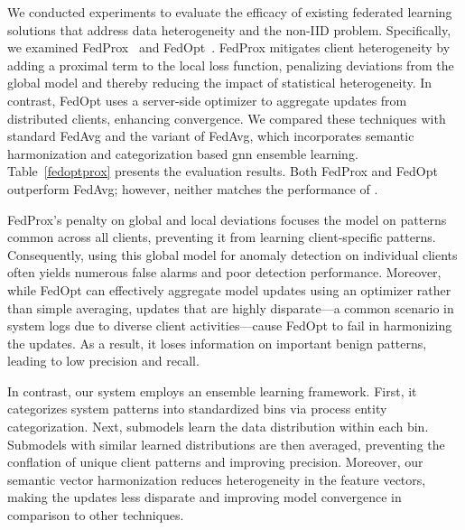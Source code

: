 We conducted experiments to evaluate the efficacy of existing federated learning solutions that address data heterogeneity and the non-IID problem. Specifically, we examined FedProx~\cite{li2020federated} and FedOpt~\cite{asad2020fedopt}. FedProx mitigates client heterogeneity by adding a proximal term to the local loss function, penalizing deviations from the global model and thereby reducing the impact of statistical heterogeneity. In contrast, FedOpt uses a server-side optimizer to aggregate updates from distributed clients, enhancing convergence. We compared these techniques with standard FedAvg and the \Sys variant of FedAvg, which incorporates semantic harmonization and categorization based gnn ensemble learning. Table~\ref{fedoptprox} presents the evaluation results. Both FedProx and FedOpt outperform FedAvg; however, neither matches the performance of \Sys.

FedProx's penalty on global and local deviations focuses the model on patterns common across all clients, preventing it from learning client-specific patterns. Consequently, using this global model for anomaly detection on individual clients often yields numerous false alarms and poor detection performance. Moreover, while FedOpt can effectively aggregate model updates using an optimizer rather than simple averaging, updates that are highly disparate—a common scenario in system logs due to diverse client activities—cause FedOpt to fail in harmonizing the updates. As a result, it loses information on important benign patterns, leading to low precision and recall.

In contrast, our system employs an ensemble learning framework. First, it categorizes system patterns into standardized bins via process entity categorization. Next, \gnnshort submodels learn the data distribution within each bin. Submodels with similar learned distributions are then averaged, preventing the conflation of unique client patterns and improving precision. Moreover, our semantic vector harmonization reduces heterogeneity in the \gnnshort feature vectors, making the updates less disparate and improving model convergence in comparison to other techniques.



